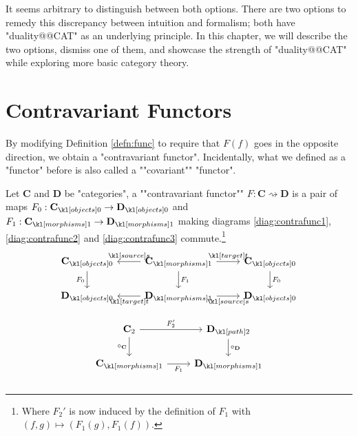 \documentclass[main.tex]{subfiles}
\begin{document}
It seems arbitrary to distinguish between both options. There are two options to remedy this discrepancy between intuition and formalism; both have "duality@@CAT" as an underlying principle. In this chapter, we will describe the two options, dismiss one of them, and showcase the strength of "duality@@CAT" while exploring more basic category theory.
\section{Contravariant Functors}
By modifying Definition \ref{defn:func} to require that $F(f)$ goes in the opposite direction, we obtain a "contravariant functor". \AP Incidentally, what we defined as a "functor" before is also called a ""covariant"" "functor".
\begin{defn}\label{defn:contrafunc}
	\AP Let $\mathbf{C}$ and $\mathbf{D}$ be "categories", a ""contravariant functor"" $F: \mathbf{C} \rightsquigarrow \mathbf{D}$ is a pair of maps $F_0:\obj{\mathbf{C}} \rightarrow \obj{\mathbf{D}}$ and $F_1:\mor{\mathbf{C}} \rightarrow \mor{\mathbf{D}}$ making diagrams \eqref{diag:contrafunc1}, \eqref{diag:contrafunc2} and \eqref{diag:contrafunc3} commute.\footnote{Where $F_2'$ is now induced by the definition of $F_1$ with $(f,g) \mapsto (F_1(g), F_1(f))$.}
	\begin{equation}\label{diag:contrafunc1}
	\begin{tikzcd}
	\obj{\mathbf{C}} \arrow[d, "F_0"'] & \mor{\mathbf{C}} \arrow[d, "F_1"] \arrow[l, "\source"'] \arrow[r, "\target"] & \obj{\mathbf{C}} \arrow[d, "F_0"] \\
	\obj{\mathbf{D}} & \mor{\mathbf{D}} \arrow[l, "\target"] \arrow[r, "\source"'] & \obj{\mathbf{D}}
	\end{tikzcd}
	\end{equation}
	\begin{minipage}{0.49\textwidth}
		\begin{equation}\label{diag:contrafunc2}
		\begin{tikzcd}
		\mathbf{C}_2 \arrow[d, "\circ_{\mathbf{C}}"'] \arrow[r, "F_2'"] & \mortwo{\mathbf{D}} \arrow[d, "\circ_{\mathbf{D}}"] \\
		\mor{\mathbf{C}} \arrow[r, "F_1"'] & \mor{\mathbf{D}}
		\end{tikzcd}
		\end{equation}
	\end{minipage}
	\begin{minipage}{0.49\textwidth}
		\begin{equation}\label{diag:contrafunc3}

\end{equation}
\end{minipage}
\end{defn}
\end{document}
